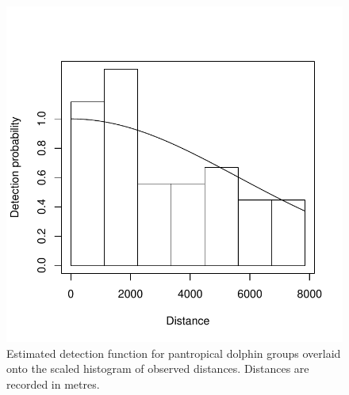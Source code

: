 \documentclass[a4paper,12pt]{article}
\begin{document}
\begin{figure}[h!]
  \caption{Estimated detection function for pantropical dolphin groups overlaid onto the scaled histogram of observed distances. Distances are recorded in metres.}
  \label{dolphin-df}
  \begin{center}
    \includegraphics[width=\textwidth]{distances}
  \end{center}
\end{figure}

\newpage
\end{document}
